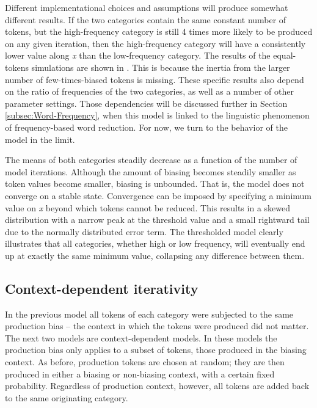 Different implementational choices and assumptions will produce somewhat
different results. If the two categories contain the same constant
number of tokens, but the high-frequency category is still 4 times
more likely to be produced on any given iteration, then the high-frequency
category will have a consistently lower value along \emph{x} than
the low-frequency category. The results of the equal-tokens simulations are shown in .
This is because the inertia from the larger number of few-times-biased
tokens is missing. These specific results also depend on the ratio
of frequencies of the two categories, as well as a number of other
parameter settings. Those dependencies will be discussed further in
Section \ref{subsec:Word-Frequency}, when this model is linked to
the linguistic phenomenon of frequency-based word reduction. For now,
we turn to the behavior of the model in the limit.

The means of both categories steadily decrease as a function of the
number of model iterations. Although the amount of biasing becomes
steadily smaller as token values become smaller, biasing is unbounded.
That is, the model does not converge on a stable state. Convergence
can be imposed by specifying a minimum value on \emph{x} beyond which
tokens cannot be reduced. This results in a skewed distribution with
a narrow peak at the threshold value and a small rightward tail due
to the normally distributed error term. The thresholded model clearly
illustrates that all categories, whether high or low frequency, will
eventually end up at exactly the same minimum value, collapsing any
difference between them. 

\subsection{\label{sec:Context-Dependent-Iterativity}Context-dependent iterativity}

In the previous model all tokens of each category were subjected to
the same production bias – the context in which the tokens were produced
did not matter. The next two models are context-dependent models.
In these models the production bias only applies to a subset of tokens,
those produced in the biasing context. As before, production tokens
are chosen at random; they are then produced in either a biasing or
non-biasing context, with a certain fixed probability. Regardless
of production context, however, all tokens are added back to the same
originating category.

